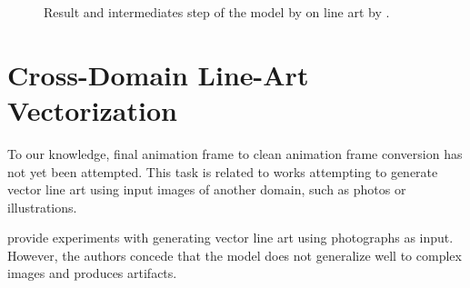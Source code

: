 \begin{figure}
    \centering
    \caption{Result and intermediates step of the model by \citet{DBLP:conf/eccv/EgiazarianVAVST20} on line art by \citet{ivanhuska}.}
    \label{fig:deepvectechdraw.steps}
\end{figure}


\section{Cross-Domain Line-Art Vectorization}
\label{sec:crossdomain}
To our knowledge, final animation frame to clean animation frame conversion has not yet been attempted. This task is related to works attempting to generate vector line art using input images of another domain, such as photos or illustrations.

\citet{mo2021virtualsketching} provide experiments with generating vector line art using photographs as input. However, the authors concede that the model does not generalize well to complex images and produces artifacts.

